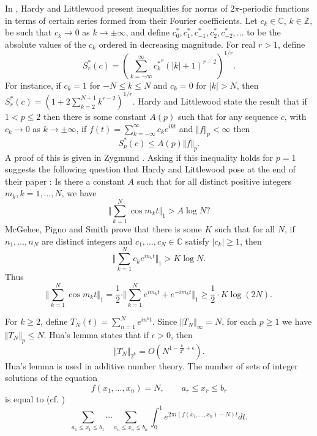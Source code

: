 \documentclass{article}
\newcommand{\norm}[1]{\Vert #1 \Vert}
\theoremstyle{definition}
\begin{document}
In \cite{MR0028445}, Hardy and Littlewood present inequalities for norms of $2\pi$-periodic functions in terms of certain series
formed from their Fourier coefficients. Let $c_k \in \mathbb{C}$, $k \in \mathbb{Z}$, be such that $c_k \to 0$ as $k \to \pm \infty$, and
define
  $c_0^*,c_1^*,c_{-1}^*,c_2^*,c_{-2}^*,\ldots$
to be the absolute values of the $c_k$ ordered in decreasing magnitude. For real $r>1$, define
\[
S_r^*(c)=\left( \sum_{k=-\infty}^\infty {c_k^*}^r (|k|+1)^{r-2} \right)^{1/r}.
\]
For instance, if $c_k=1$ for $-N \leq k \leq N$ and $c_k=0$ for $|k|>N$, then $S_r^*(c)=\left(1+2\sum_{k=2}^{N+1} k^{r-2} \right)^{1/r}$. 
Hardy and Littlewood state the result \cite[p.~164, Theorem 2]{MR0028445} that if $1<p \leq 2$ then there is some constant $A(p)$ such that for any sequence $c$, with $c_k \to 0$ as $k \to \pm \infty$,
if $f(t)=\sum_{k=-\infty}^\infty c_k e^{ikt}$ and $\norm{f}_p < \infty$ then
\[
S_p^*(c) \leq A(p)\norm{f}_p.
\]
A proof of this is given in Zygmund \cite[vol.~II, p.~128, chap.~XII, Theorem~6.3]{zygmund}.
Asking if this inequality holds for $p=1$ suggests the following question that Hardy and Littlewood pose at the end of their paper \cite[p.~168]{MR0028445}: Is there a constant $A$ such that
for all distinct positive integers $m_k, k=1,\ldots,N$, we have
\[
\norm{\sum_{k=1}^N \cos m_k t}_1 > A \log N?
\]
McGehee, Pigno and Smith \cite{MR621019} prove that there is some $K$ such that for all $N$, if
$n_1,\ldots,n_N$ are distinct integers and $c_1,\ldots,c_N \in \mathbb{C}$ satisfy $|c_k| \geq 1$, then
\[
\norm{\sum_{k=1}^N c_k e^{in_k t}}_1 > K \log N.
\]
Thus
\[
\norm{\sum_{k=1}^N \cos m_k t}_1 =\frac{1}{2}\cdot \norm{\sum_{k=1}^N e^{im_kt}+e^{-im_kt}}_1
\geq \frac{1}{2}\cdot K\log(2N).
\]





For $k \geq 2$, define $T_N(t)=\sum_{n=1}^N e^{in^k t}$. Since $\norm{T_N}_\infty=N$, for each $p \geq 1$ we have $\norm{T_N}_p \leq N$.  Hua's lemma \cite[p.~116, Theorem~4.6]{nathanson} states that if $\epsilon>0$, then 
\[
\norm{T_N}_{2^k}=O\left( N^{1-\frac{k}{2^k}+\epsilon} \right).
\]
Hua's lemma is used in additive number theory. The number of sets of integer solutions of the equation
\[
f(x_1,\ldots,x_n)=N, \qquad a_r \leq x_r \leq b_r
\]
is equal to (cf. \cite[p.~151]{hua})
\[
\sum_{a_1 \leq x_1 \leq b_1} \cdots \sum_{a_n \leq x_n \leq b_n} \int_0^1 e^{2\pi i(f(x_1,\ldots,x_n)-N)t} dt.
\]
\end{document}
